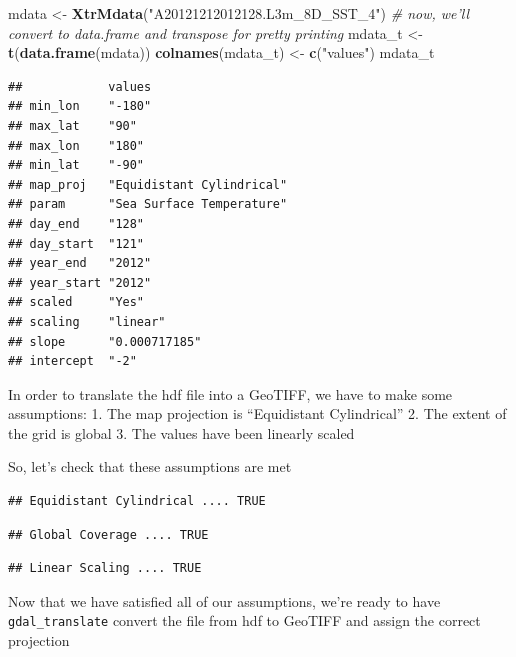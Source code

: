 \documentclass[]{article}
\newenvironment{Shaded}{}{}
\newcommand{\KeywordTok}[1]{\textcolor[rgb]{0.00,0.44,0.13}{\textbf{{#1}}}}
\newcommand{\StringTok}[1]{\textcolor[rgb]{0.25,0.44,0.63}{{#1}}}
\newcommand{\CommentTok}[1]{\textcolor[rgb]{0.38,0.63,0.69}{\textit{{#1}}}}
\newcommand{\NormalTok}[1]{{#1}}
\begin{document}
\begin{Shaded}
\begin{Highlighting}[]
\NormalTok{mdata <- }\KeywordTok{XtrMdata}\NormalTok{(}\StringTok{"A20121212012128.L3m_8D_SST_4"}\NormalTok{)}
\CommentTok{# now, we'll convert to data.frame and transpose for pretty printing}
\NormalTok{mdata_t <- }\KeywordTok{t}\NormalTok{(}\KeywordTok{data.frame}\NormalTok{(mdata))}
\KeywordTok{colnames}\NormalTok{(mdata_t) <- }\KeywordTok{c}\NormalTok{(}\StringTok{"values"}\NormalTok{)}
\NormalTok{mdata_t}
\end{Highlighting}
\end{Shaded}
\begin{verbatim}
##            values                   
## min_lon    "-180"                   
## max_lat    "90"                     
## max_lon    "180"                    
## min_lat    "-90"                    
## map_proj   "Equidistant Cylindrical"
## param      "Sea Surface Temperature"
## day_end    "128"                    
## day_start  "121"                    
## year_end   "2012"                   
## year_start "2012"                   
## scaled     "Yes"                    
## scaling    "linear"                 
## slope      "0.000717185"            
## intercept  "-2"                     
\end{verbatim}

In order to translate the hdf file into a GeoTIFF, we have to make some
assumptions: 1. The map projection is ``Equidistant Cylindrical'' 2. The
extent of the grid is global 3. The values have been linearly scaled

So, let's check that these assumptions are met

\begin{verbatim}
## Equidistant Cylindrical .... TRUE
\end{verbatim}

\begin{verbatim}
## Global Coverage .... TRUE
\end{verbatim}

\begin{verbatim}
## Linear Scaling .... TRUE
\end{verbatim}

Now that we have satisfied all of our assumptions, we're ready to have
\texttt{gdal\_translate} convert the file from hdf to GeoTIFF and assign
the correct projection
\end{document}
